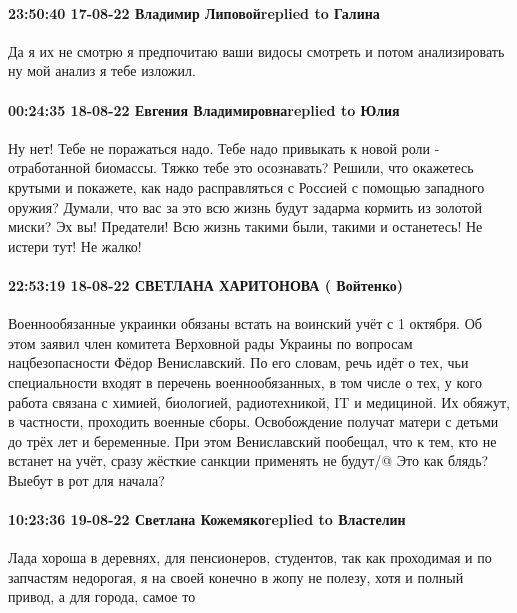  
 
 
 
 

\paragraph{23:50:40 17-08-22 Владимир Липовойreplied to Галина}

Да я их не смотрю я предпочитаю ваши видосы смотреть и потом анализировать ну
мой анализ я тебе изложил.

\paragraph{00:24:35 18-08-22 Евгения Владимировнаreplied to Юлия}

Ну нет! Тебе не поражаться надо. Тебе надо привыкать к новой роли -
отработанной биомассы. Тяжко тебе это осознавать? Решили, что окажетесь крутыми
и покажете, как надо расправляться с Россией с помощью западного оружия?
Думали, что вас за это всю жизнь будут задарма кормить из золотой миски? Эх вы!
Предатели! Всю жизнь такими были, такими и останетесь! Не истери тут! Не жалко!

\paragraph{22:53:19 18-08-22 СВЕТЛАНА ХАРИТОНОВА ( Войтенко)}

Военнообязанные украинки обязаны встать на воинский учёт с 1 октября.
Об этом заявил член комитета Верховной рады Украины по вопросам нацбезопасности Фёдор Вениславский.
По его словам, речь идёт о тех, чьи специальности входят в перечень военнообязанных, в том числе о тех, у кого работа связана с химией, биологией, радиотехникой, IT и медициной.
Их обяжут, в частности, проходить военные сборы. Освобождение получат матери с детьми до трёх лет и беременные.
При этом Вениславский пообещал, что к тем, кто не встанет на учёт, сразу жёсткие санкции применять не будут/@
Это как блядь?Выебут в рот для начала?🤣🤣🤣

\paragraph{10:23:36 19-08-22 Светлана Кожемякоreplied to Властелин}

Лада хороша в деревнях, для пенсионеров, студентов, так как проходимая и по
запчастям недорогая, я на своей конечно в жопу не полезу, хотя и полный привод,
а для города, самое то
